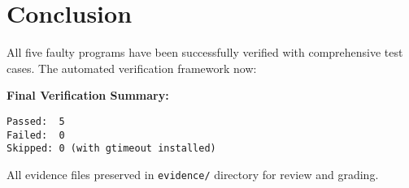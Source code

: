 \documentclass[11pt,a4paper]{article}
\begin{document}
\section{Conclusion}

All five faulty programs have been successfully verified with comprehensive test cases. The automated verification framework now:


\textbf{Final Verification Summary:}
\begin{verbatim}
Passed:  5
Failed:  0
Skipped: 0 (with gtimeout installed)
\end{verbatim}

All evidence files preserved in \texttt{evidence/} directory for review and grading.
\end{document}
